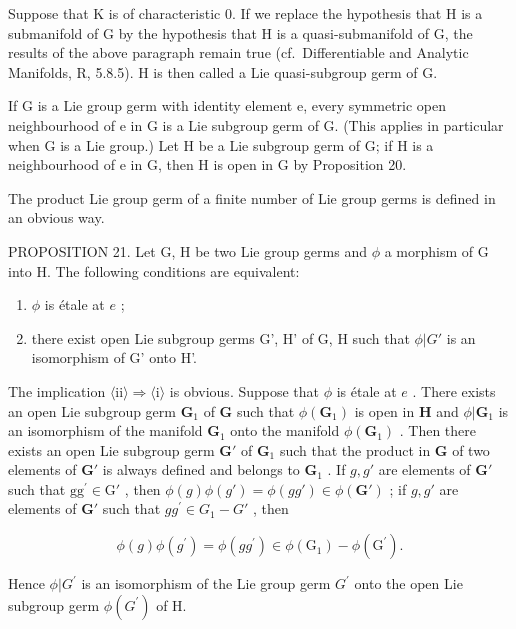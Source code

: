 Suppose that K is of characteristic 0. If we replace the hypothesis that H is a submanifold of G by the hypothesis that H is a quasi-submanifold of G, the results of the above paragraph remain true (cf.~Differentiable and Analytic Manifolds, R, 5.8.5). H is then called a Lie quasi-subgroup germ of G.

If G is a Lie group germ with identity element e, every symmetric open neighbourhood of e in G is a Lie subgroup germ of G. (This applies in particular when G is a Lie group.) Let H be a Lie subgroup germ of G; if H is a neighbourhood of e in G, then H is open in G by Proposition 20.

The product Lie group germ of a finite number of Lie group germs is defined in an obvious way.

PROPOSITION 21. Let G, H be two Lie group germs and \(\phi\) a morphism of G into H. The following conditions are equivalent:

\begin{enumerate}
\def\labelenumi{(\roman{enumi})}
\item
  \(\phi\) is étale at \(e\) ;
\item
  there exist open Lie subgroup germs G', H' of G, H such that \(\phi|G'\) is an isomorphism of G' onto H'.
\end{enumerate}

The implication \(\langle \mathrm{ii}\rangle \Rightarrow \langle \mathrm{i}\rangle\) is obvious. Suppose that \(\phi\) is étale at \(e\) . There exists an open Lie subgroup germ \(\mathbf{G}_1\) of \(\mathbf{G}\) such that \(\phi (\mathbf{G}_1)\) is open in \(\mathbf{H}\) and \(\phi |\mathbf{G}_1\) is an isomorphism of the manifold \(\mathbf{G}_1\) onto the manifold \(\phi (\mathbf{G}_1)\) . Then there exists an open Lie subgroup germ \(\mathbf{G}'\) of \(\mathbf{G}_1\) such that the product in \(\mathbf{G}\) of two elements of \(\mathbf{G}'\) is always defined and belongs to \(\mathbf{G}_1\) . If \(g, g'\) are elements of \(\mathbf{G}'\) such that \(\mathrm{gg}^{\prime}\in \mathrm{G}'\) , then \(\phi (g)\phi (g') = \phi (gg')\in \phi (\mathbf{G}')\) ; if \(g, g'\) are elements of \(\mathbf{G}'\) such that \(gg^{\prime}\in G_1 - G'\) , then

\[
\phi (g) \phi (g ^ {\prime}) = \phi (g g ^ {\prime}) \in \phi (\mathrm{G} _ {1}) - \phi (\mathrm{G} ^ {\prime}).
\]

Hence \(\phi |G^{\prime}\) is an isomorphism of the Lie group germ \(G^{\prime}\) onto the open Lie subgroup germ \(\phi (G^{\prime})\) of H.

